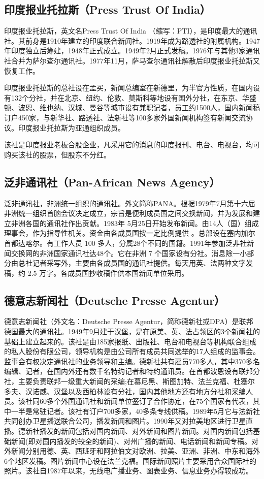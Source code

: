 \documentclass[a4paper,openany]{book}
\begin{document}
\subsection{印度报业托拉斯（Press Trust Of India）}

印度报业托拉斯，英文名Press Trust Of India （缩写：PTI），是印度最大的通讯社。其前身是1910年建立的印度联合新闻社。1919年成为路透社的附属机构。1947年印度独立后筹建，1948年正式成立。1949年2月正式发稿。1976年与其他3家通讯社合并为萨尔查尔通讯社。1977年11月，萨马查尔通讯社解散后印度报业托拉斯又恢复工作。

印度报业托拉斯的总社设在孟买，新闻总编室在新德里，为半官方性质，在国内设有132个分社，并在北京、纽约、伦敦、莫斯科等地设有国外分社，在东京、华盛顿、波恩、维也纳、汉城、曼谷等城市设有兼职记者，员工约1500人，国内新闻稿订户450家，与新华社、路透社、法新社等100多家外国新闻机构签有新闻交流协议。印度报业托拉斯为亚通组织成员。

该社是印度报业老板合股企业，凡采用它的消息的印度报刊、电台、电视台，均可购买该社的股票，但股东不分红。

\subsection{泛非通讯社（Pan-African News Agency）}

泛非通讯社，非洲统一组织的通讯社。外文简称PANA。根据1979年7月第十六届非洲统一组织首脑会议决定成立，宗旨是便利成员国之间交换新闻，并为发展和建立非洲各国的通讯社作出贡献。1983年 5月25日开始发布新闻。由14人（国）组成理事会，作为指导性机关。资金由各成员国按一定比例提供 。总部设在塞内加尔首都达喀尔。有工作人员 100 多人，分属28个不同的国籍。1991年参加泛非社新闻交换网的非洲国家通讯社达48个。它在非洲 7 个国家设有分社。消息除一小部分由总社记者采写外，主要由各成员国的通讯社提供。每天用英、法两种文字发稿，约 2.5 万字。各成员国抄收稿件供本国新闻单位采用。

\subsection{德意志新闻社（Deutsche Presse Agentur）}

德意志新闻社（外文名：Deutsche Presse Agentur，简称德新社或DPA）是联邦德国最大的通讯社。1949年9月建于汉堡，是在原美、英、法占领区的3个新闻社的基础上建立起来的。该社是由185家报纸、出版社、电台和电视台等机构联合组成的私人股份有限公司，领导机构是由公司所有成员共同选举的17人组成的监事会。监事会有权决定通讯社的业务领导和主编。德新社共有雇员770多人，其中370多名编辑、记者，在国内外还有数千名特约记者和特约通讯员。在首都波恩设有联邦分社，主要负责联邦一级重大新闻的采编;在慕尼黑、斯图加特、法兰克福、杜塞尔多夫、汉诺威、汉堡以及西柏林设有分社，国内其他地方还有地方分社和采编人员。该社同60多个外国通讯社和新闻单位签订了合作协定，在75个国家有代表，其中一半是常驻记者。该社有订户700多家，40多条专线供稿。1989年5月它与法新社共同创办卫星播送联合公司，播发新闻和图片。1990年又对拉美地区进行卫星直播。德新社播发的新闻包括对国内新闻、对外新闻和图片新闻。对国内新闻包括基础新闻(即对国内播发的较全的新闻)、对州广播的新闻、电话新闻和新闻专稿。对外新闻分别用德、英、西班牙和阿拉伯文对欧洲、拉美、亚洲、非洲、中东和海外6个地区发稿。图片新闻中心设在法兰克福。国际新闻照片主要采用合众国际社的照片。该社自1987年以来，无线电广播业务、图表业务、信息业务办得较成功。
\end{document}
